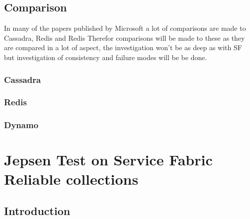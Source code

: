 \documentclass[a4paper,10pt,titlepage]{report}
\begin{document}
\section{Comparison}

In many of the papers published by Microsoft a lot of comparisons are made to Cassadra, Redis and Redis Therefor comparisons will be made to these as they are compared in a lot of aspect, the investigation won't be as deep as with SF but investigation of consistency and failure modes will be be done.

\subsection{Cassadra}

\subsection{Redis}

\subsection{Dynamo}


\chapter{Jepsen Test on Service Fabric Reliable collections}

\section{Introduction}
\end{document}
